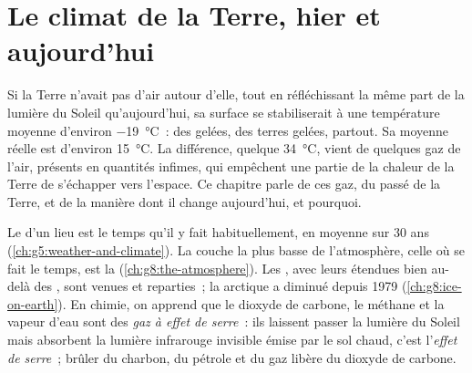 \chapter{Le climat de la Terre, hier et aujourd'hui}\label{ch:g9:climate-past-and-present}

Si la Terre n'avait pas d'air autour d'elle, tout en réfléchissant la même
part de la lumière du Soleil qu'aujourd'hui, sa surface se stabiliserait à
une température moyenne d'environ \qty{-19}{\degreeCelsius}~: des 
gelées, des terres gelées, partout. Sa moyenne réelle est d'environ
\qty{15}{\degreeCelsius}. La différence, quelque \qty{34}{\degreeCelsius},
vient de quelques gaz de l'air, présents en quantités infimes, qui
empêchent une partie de la chaleur de la Terre de s'échapper vers
l'espace. Ce chapitre parle de ces gaz, du  passé de la Terre, et
de la manière dont il change aujourd'hui, et pourquoi.

\begin{recall}
Le  d'un lieu est le temps qu'il y fait habituellement, en moyenne
sur 30 ans (\cref{ch:g5:weather-and-climate}). La couche la plus basse de
l'atmosphère, celle où se fait le temps, est la 
(\cref{ch:g8:the-atmosphere}). Les , avec leurs  étendues bien au-delà des , sont venues et reparties~; la
 arctique a diminué depuis 1979 (\cref{ch:g8:ice-on-earth}). En
chimie, on apprend que le dioxyde de carbone, le méthane et la vapeur
d'eau sont des \emph{gaz à effet de serre}~: ils laissent passer la
lumière du Soleil mais absorbent la lumière infrarouge invisible émise par
le sol chaud, c'est l'\emph{effet de serre}~; brûler du charbon, du
pétrole et du gaz libère du dioxyde de carbone.
\end{recall}

